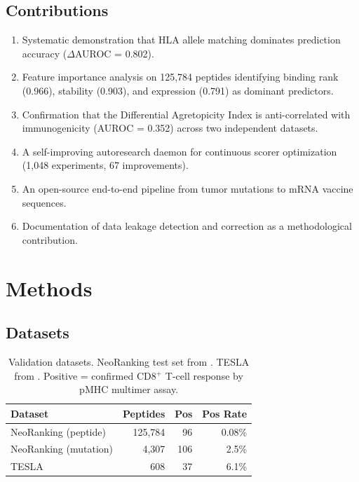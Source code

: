 \documentclass[11pt,twocolumn]{article}
\begin{document}
\subsection{Contributions}

\begin{enumerate}[leftmargin=*,topsep=0pt,itemsep=2pt]
\item Systematic demonstration that HLA allele matching dominates prediction accuracy ($\Delta$AUROC = 0.802).
\item Feature importance analysis on 125,784 peptides identifying binding rank (0.966), stability (0.903), and expression (0.791) as dominant predictors.
\item Confirmation that the Differential Agretopicity Index is anti-correlated with immunogenicity (AUROC = 0.352) across two independent datasets.
\item A self-improving autoresearch daemon for continuous scorer optimization (1,048 experiments, 67 improvements).
\item An open-source end-to-end pipeline from tumor mutations to mRNA vaccine sequences.
\item Documentation of data leakage detection and correction as a methodological contribution.
\end{enumerate}

\section{Methods}

\subsection{Datasets}

\begin{table}[ht]
\centering
\small
\begin{tabular}{@{}lrrr@{}}
\toprule
Dataset & Peptides & Pos & Pos Rate \\
\midrule
NeoRanking (peptide) & 125,784 & 96 & 0.08\% \\
NeoRanking (mutation) & 4,307 & 106 & 2.5\% \\
TESLA & 608 & 37 & 6.1\% \\
\bottomrule
\end{tabular}
\caption{Validation datasets. NeoRanking test set from \citet{muller2023neoranking}. TESLA from \citet{wells2020tesla}. Positive = confirmed CD8$^{+}$ T-cell response by pMHC multimer assay.}
\end{table}
\end{document}
